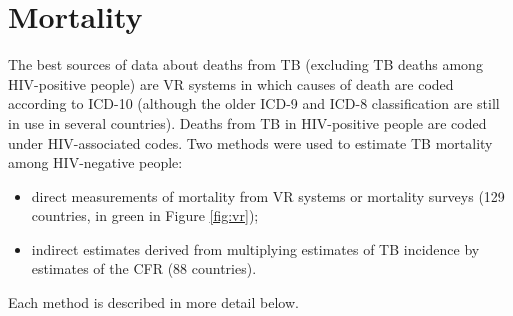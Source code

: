 \section{Mortality}  

The best sources of data about deaths from TB (excluding TB deaths among HIV-positive people) are VR systems in which causes of death are coded according to ICD-10 (although the older ICD-9 and ICD-8 classification are still in use in several countries). Deaths from TB in HIV-positive people are coded under HIV-associated codes.  Two methods were used to estimate TB mortality among HIV-negative people:   

\begin{itemize}
    \item direct measurements of mortality from VR systems or mortality surveys (129 countries, in green in Figure \ref{fig:vr});
    \item indirect estimates derived from multiplying estimates of TB incidence by estimates of the CFR (88 countries).
    \end{itemize}  
    
Each method is described in more detail below.  